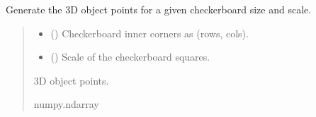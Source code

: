 \documentclass[letterpaper,10pt,english]{sphinxmanual}
\begin{document}
\begin{fulllineitems}
\label{\detokenize{PoseEstimator:PoseEstimator.pose_estimator.generate_objp}}
\pysigstartsignatures
{}
\pysigstopsignatures
\sphinxAtStartPar
Generate the 3D object points for a given checkerboard size and scale.
\begin{quote}\begin{description}
\begin{itemize}
\item {} 
\sphinxAtStartPar
{} () \textendash{} Checkerboard inner corners as (rows, cols).

\item {} 
\sphinxAtStartPar
{} () \textendash{} Scale of the checkerboard squares.

\end{itemize}

\sphinxAtStartPar
3D object points.

\sphinxAtStartPar
numpy.ndarray

\end{description}\end{quote}

\end{fulllineitems}

\end{document}
